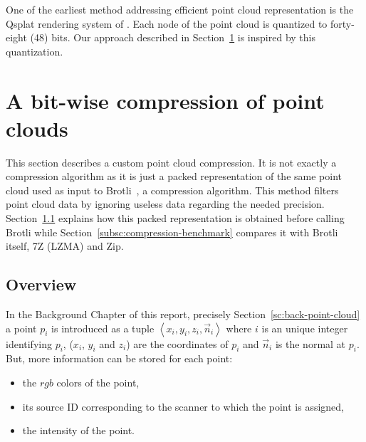 One of the earliest method addressing efficient point cloud representation is the Qsplat rendering system of \cite{qsplat}. Each node of the point cloud is quantized to forty-eight (48) bits. Our approach described in Section~\ref{sc:custom-compression} is inspired by this quantization.

\section{A bit-wise compression of point clouds}
\label{sc:custom-compression}
This section describes a custom point cloud compression. It is not exactly a compression algorithm as it is just a packed representation of the same point cloud used as input to Brotli~\cite{brotli}, a compression algorithm. This method filters point cloud data by ignoring useless data regarding the needed precision. Section~\ref{subsc:overview-packed} explains how this packed representation is obtained before calling Brotli while Section~\ref{subsc:compression-benchmark} compares it with Brotli itself, 7Z (LZMA) and Zip.

\subsection{Overview}
\label{subsc:overview-packed}
In the Background Chapter of this report, precisely Section~\ref{sc:back-point-cloud} a point $p_i$ is introduced as a tuple $\left\langle x_i, y_i, z_i, \vec{n}_i \right\rangle$ where $i$ is an unique integer identifying $p_i$, ($x_i$, $y_i$ and $z_i$) are the coordinates of $p_i$ and $\vec{n}_i$ is the normal at $p_i$. But, more information can be stored for each point:
\begin{itemize}
\item the $rgb$ colors of the point,
\item its source ID corresponding to the scanner to which the point is assigned,
\item the intensity of the point.
\end{itemize}

